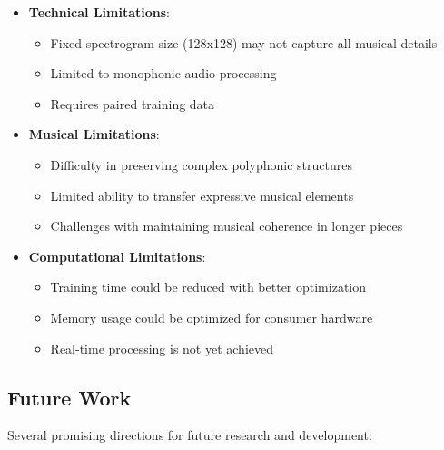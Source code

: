 \begin{itemize}
    \item \textbf{Technical Limitations}:
    \begin{itemize}
        \item Fixed spectrogram size (128x128) may not capture all musical details
        \item Limited to monophonic audio processing
        \item Requires paired training data
    \end{itemize}
    
    \item \textbf{Musical Limitations}:
    \begin{itemize}
        \item Difficulty in preserving complex polyphonic structures
        \item Limited ability to transfer expressive musical elements
        \item Challenges with maintaining musical coherence in longer pieces
    \end{itemize}
    
    \item \textbf{Computational Limitations}:
    \begin{itemize}
        \item Training time could be reduced with better optimization
        \item Memory usage could be optimized for consumer hardware
        \item Real-time processing is not yet achieved
    \end{itemize}
\end{itemize}

\subsection{Future Work}
Several promising directions for future research and development:

